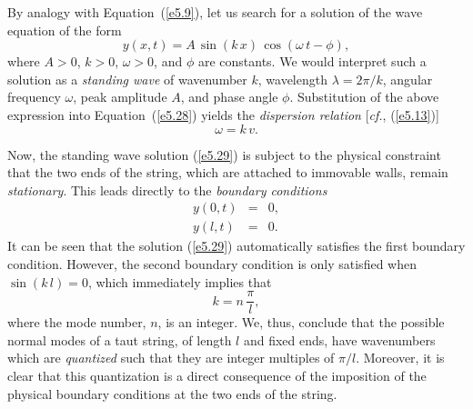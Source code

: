 By analogy with Equation~(\ref{e5.9}), let us search for a solution of the wave
equation of the form
\begin{equation}\label{e5.29}
y(x,t) = A\,\sin(k\,x)\,\cos(\omega\,t-\phi),
\end{equation}
where $A>0$, $k>0$, $\omega>0$, and $\phi$ are constants. We would interpret such
a solution as a {\em standing wave}\/ of wavenumber $k$, wavelength $\lambda=2\pi/k$, angular frequency $\omega$,
peak amplitude $A$, and phase angle $\phi$. Substitution of the above
expression into Equation~(\ref{e5.28}) yields the {\em dispersion relation}\/
[{\em cf.}, (\ref{e5.13})]
\begin{equation}
\omega = k\,v.
\end{equation}

Now, the standing wave solution (\ref{e5.29}) is subject to the physical constraint that the two ends of the string, which are attached to immovable walls, 
remain {\em stationary}.  This leads directly to the {\em boundary conditions}
\begin{eqnarray}
y(0, t)&=& 0,\label{e5.31}\\[0.5ex]
y(l,t) &=&0.\label{e5.32}
\end{eqnarray}
It can be seen that the solution (\ref{e5.29}) automatically satisfies the first boundary
condition. However, the second boundary condition is only satisfied when $\sin(k\,l)=0$,
which immediately implies that
\begin{equation}
k = n\,\frac{\pi}{l},
\end{equation}
where the mode number, $n$, is an integer. We, thus, conclude that the
possible normal modes of a taut string, of length $l$ and
fixed ends,  have wavenumbers which are {\em quantized}\/ such that they
are integer multiples of $\pi/l$. Moreover, it is clear  that this quantization is a direct
consequence of the imposition of the physical boundary
conditions at the two ends of the string.

